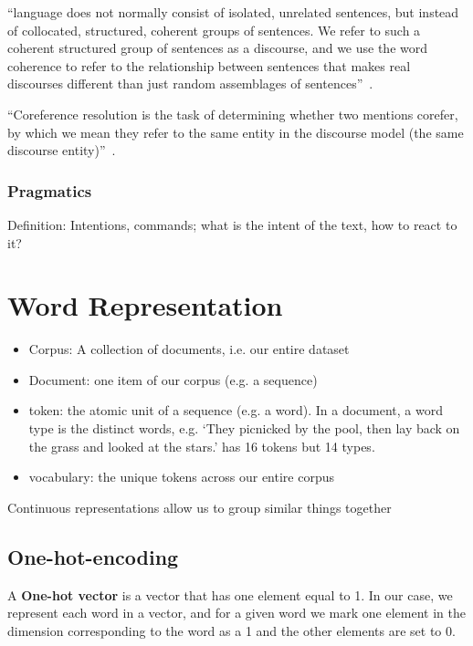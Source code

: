 \documentclass[11pt]{article}
\begin{document}
``language does not normally consist of isolated, unrelated sentences, but instead of collocated, structured, coherent groups of sentences. We refer to such a coherent structured group of sentences as a discourse, and we use the word coherence to refer to the relationship between sentences that makes real discourses different than just random assemblages of sentences''~\cite{book-speech-and-language-processing}.

``Coreference resolution is the task of determining whether two mentions corefer, by which we mean they refer to the same entity in the discourse model (the same discourse entity)''~\cite{book-speech-and-language-processing}.

\subsubsection{Pragmatics}

Definition: Intentions, commands; what is the intent of the text, how to react to it?

\section{Word Representation}

\begin{itemize}
    \item Corpus: A collection of documents, i.e. our entire dataset
    \item Document: one item of our corpus (e.g. a sequence)
    \item token: the atomic unit of a sequence (e.g. a word). In a document, a word type is the distinct words, e.g. `They picnicked by the pool, then lay back on the grass and looked at the stars.' has 16 tokens but 14 types.
    \item vocabulary: the unique tokens across our entire corpus
\end{itemize}

Continuous representations allow us to group similar things together

\subsection{One-hot-encoding}

A \textbf{One-hot vector} is a vector that has one element equal to 1. In our case, we represent each word in a vector, and for a given word we mark one element in the dimension corresponding to the word as a 1 and the other elements are set to 0.
\end{document}
